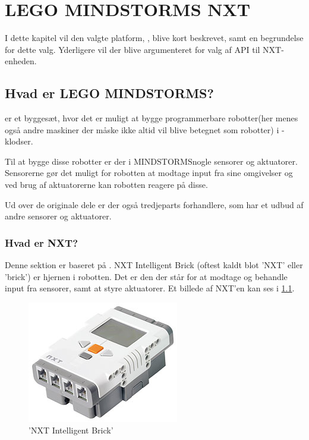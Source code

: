 
\chapter{LEGO MINDSTORMS NXT}
I dette kapitel vil den valgte platform, \legoms, blive kort beskrevet, samt en begrundelse for dette valg.
Yderligere vil der blive argumenteret for valg af API til NXT-enheden.

\section{Hvad er LEGO MINDSTORMS?}
\legoms er et byggesæt, hvor det er muligt at bygge programmerbare robotter(her menes også andre maskiner der måske ikke altid vil blive betegnet som robotter) i \lego-klodser.

Til at bygge disse robotter er der i MINDSTORMS\texttrademark nogle sensorer og aktuatorer. Sensorerne gør det muligt for robotten at modtage input fra sine omgivelser og ved brug af aktuatorerne kan robotten reagere på disse.

Ud over de originale \lego dele er der også tredjeparts forhandlere, som har et udbud af andre sensorer og aktuatorer.

\subsection{Hvad er NXT?}
Denne sektion er baseret på \cite{nxt}.
NXT Intelligent Brick (oftest kaldt blot 'NXT' eller 'brick') er hjernen i \legoms robotten.
Det er den der står for at modtage og behandle input fra sensorer, samt at styre aktuatorer.
Et billede af NXT'en kan ses i \cref{platform:nxt}.

\begin{figure}
\begin{center}
\includegraphics[scale=1]{./graphics/nxt/nxt}
\end{center}
\caption{'NXT Intelligent Brick'}
\label{platform:nxt}
\end{figure}

